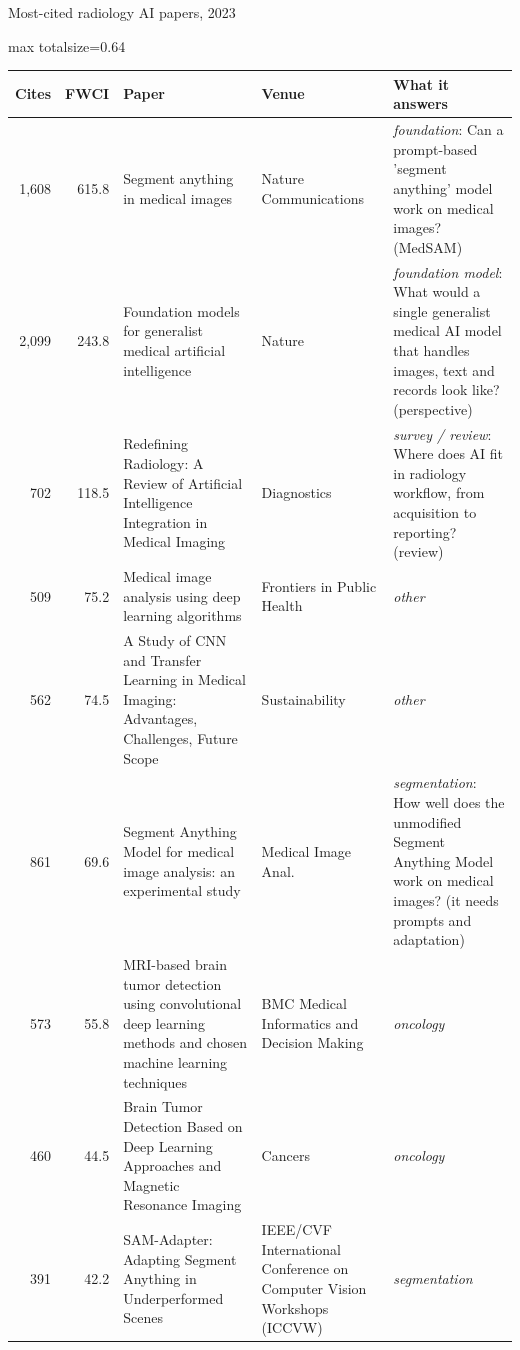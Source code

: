 \documentclass[aspectratio=169]{beamer}
\renewcommand{\arraystretch}{1.08}
\begin{document}
\begin{frame}[category=Journals/Preprints]{Most-cited radiology AI papers, 2023}
\tiny
\begin{adjustbox}{max totalsize={\textwidth}{0.64\textheight}}
\renewcommand{\arraystretch}{1.2}
\begin{tabular}{|r|r|>{\raggedright\arraybackslash}p{}|>{\raggedright\arraybackslash}p{}|>{\raggedright\arraybackslash}p{}|}
\hline \textbf{Cites} & \textbf{FWCI} & \textbf{Paper} & \textbf{Venue} & \textbf{What it answers} \\ \hline
1,608 & 615.8 & Segment anything in medical images & Nature Communications & \textit{foundation}: Can a prompt-based 'segment anything' model work on medical images? (MedSAM) \\ \hline
2,099 & 243.8 & Foundation models for generalist medical artificial intelligence & Nature & \textit{foundation model}: What would a single generalist medical AI model that handles images, text and records look like? (perspective) \\ \hline
702 & 118.5 & Redefining Radiology: A Review of Artificial Intelligence Integration in Medical Imaging & Diagnostics & \textit{survey / review}: Where does AI fit in radiology workflow, from acquisition to reporting? (review) \\ \hline
509 & 75.2 & Medical image analysis using deep learning algorithms & Frontiers in Public Health & \textit{other} \\ \hline
562 & 74.5 & A Study of CNN and Transfer Learning in Medical Imaging: Advantages, Challenges, Future Scope & Sustainability & \textit{other} \\ \hline
861 & 69.6 & Segment Anything Model for medical image analysis: an experimental study & Medical Image Anal. & \textit{segmentation}: How well does the unmodified Segment Anything Model work on medical images? (it needs prompts and adaptation) \\ \hline
573 & 55.8 & MRI-based brain tumor detection using convolutional deep learning methods and chosen machine learning techniques & BMC Medical Informatics and Decision Making & \textit{oncology} \\ \hline
460 & 44.5 & Brain Tumor Detection Based on Deep Learning Approaches and Magnetic Resonance Imaging & Cancers & \textit{oncology} \\ \hline
391 & 42.2 & SAM-Adapter: Adapting Segment Anything in Underperformed Scenes & 2023 IEEE/CVF International Conference on Computer Vision Workshops (ICCVW) & \textit{segmentation} \\ \hline

\end{tabular}
\end{adjustbox}
\end{frame}
\end{document}

